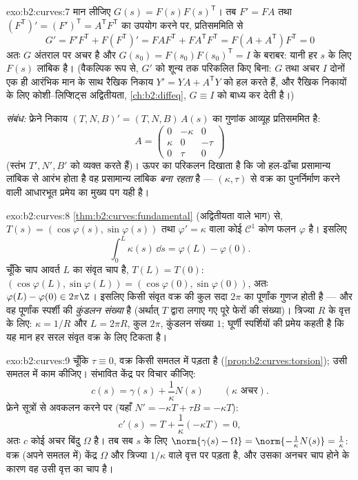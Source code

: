 \begin{solution}{exo:b2:curves:7}
मान लीजिए $G(s) = F(s)F(s)^{\mathsf T}$। तब $F' = FA$ तथा
$(F^{\mathsf T})' = (F')^{\mathsf T} = A^{\mathsf T}F^{\mathsf T}$ का उपयोग करने पर, प्रतिसममिति से
\[
G' = F'F^{\mathsf T} + F(F^{\mathsf T})'
= FAF^{\mathsf T} + FA^{\mathsf T}F^{\mathsf T}
= F(A + A^{\mathsf T})F^{\mathsf T} = 0
\]
अतः $G$ अंतराल पर अचर है और $G(s_0) = F(s_0)F(s_0)^{\mathsf T} = I$ के बराबर: यानी हर $s$ के
लिए $F(s)$ लांबिक है। (वैकल्पिक रूप से, $G'$ को
शून्य तक परिकलित किए बिना: $G$ तथा अचर $I$ दोनों एक ही आरंभिक
मान के साथ रैखिक निकाय $Y' = YA +
A^{\mathsf T}Y$ को हल करते हैं, और रैखिक निकायों के
लिए कोशी--लिप्शिट्स अद्वितीयता, \cref{ch:b2:diffeq}, $G
\equiv I$ को बाध्य कर देती है।)

\emph{संबंध:} फ्रेने निकाय $(T, N, B)' = (T, N, B)\,A(s)$
का गुणांक आव्यूह प्रतिसममित है:
\[
A = \begin{pmatrix} 0 & -\kappa & 0\\ \kappa & 0 & -\tau\\
0 & \tau & 0\end{pmatrix}
\]
(स्तंभ $T', N', B'$ को व्यक्त करते हैं)। ऊपर का परिकलन दिखाता है कि
जो हल-ढाँचा प्रसामान्य लांबिक से आरंभ होता है वह प्रसामान्य लांबिक
\emph{बना रहता} है --- $(\kappa, \tau)$ से वक्र का पुनर्निर्माण करने वाली
आधारभूत प्रमेय का मुख्य पग यही है।
\end{solution}

\begin{solution}{exo:b2:curves:8}
\cref{thm:b2:curves:fundamental} (अद्वितीयता वाले भाग) से, $T(s) =
(\cos\varphi(s), \sin\varphi(s))$ तथा $\varphi' = \kappa$ वाला कोई
$\mathcal{C}^1$ कोण फलन $\varphi$ है। इसलिए
\[
\int_0^L \kappa(s)\,\dd s = \varphi(L) - \varphi(0) .
\]
चूँकि चाप आवर्त $L$ का संवृत चाप है, $T(L) = T(0)$:
$(\cos\varphi(L), \sin\varphi(L)) = (\cos\varphi(0),
\sin\varphi(0))$, अतः $\varphi(L) - \varphi(0) \in 2\pi\Z$। इसलिए किसी संवृत वक्र की
कुल  सदा $2\pi$ का पूर्णांक गुणज होती है --- और वह पूर्णांक
स्पर्शी की \emph{कुंडलन संख्या} है (अर्थात् $T$ द्वारा लगाए गए
पूरे फेरों की संख्या)। त्रिज्या $R$ के वृत्त के लिए: $\kappa = 1/R$ और $L = 2\pi R$,
कुल  $2\pi$, कुंडलन संख्या $1$; घूर्णी स्पर्शियों की प्रमेय
कहती है कि यह मान हर सरल संवृत वक्र के लिए टिकता है।
\end{solution}

\begin{solution}{exo:b2:curves:9}
चूँकि $\tau \equiv 0$, वक्र किसी समतल में पड़ता है
(\cref{prop:b2:curves:torsion}); उसी समतल में काम कीजिए। संभावित केंद्र पर
विचार कीजिए:
\[
c(s) = \gamma(s) + \frac{1}{\kappa}N(s)
\qquad (\kappa \text{ अचर}).
\]
फ्रेने सूत्रों से अवकलन करने पर (यहाँ $N' = -\kappa T + \tau B
= -\kappa T$):
\[
c'(s) = T + \frac1\kappa(-\kappa T) = 0 ,
\]
अतः $c$ कोई अचर बिंदु $\Omega$ है। तब सब $s$ के लिए $\norm{\gamma(s) -
\Omega} = \norm{-\frac1\kappa N(s)} = \frac1\kappa$:
वक्र (अपने समतल में) केंद्र $\Omega$ और त्रिज्या $1/\kappa$ वाले वृत्त पर
पड़ता है, और उसका अनचर चाप होने के कारण वह उसी वृत्त का चाप है।
\end{solution}

